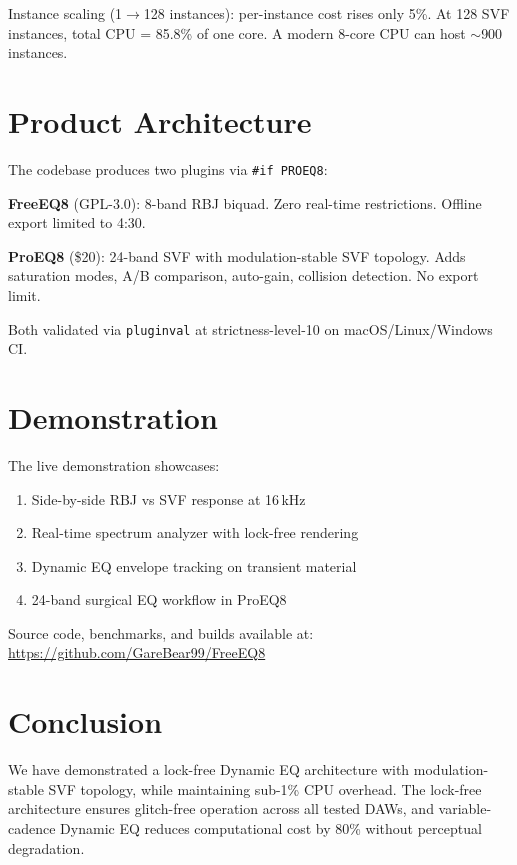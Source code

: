 \documentclass[twocolumn]{article}
\begin{document}
Instance scaling (1$\rightarrow$128 instances): per-instance cost rises only 5\%. At 128 SVF instances, total CPU = 85.8\% of one core. A modern 8-core CPU can host $\sim$900 instances.

\section{Product Architecture}

The codebase produces two plugins via \texttt{\#if PROEQ8}:

\textbf{FreeEQ8} (GPL-3.0): 8-band RBJ biquad. Zero real-time restrictions. Offline export limited to 4:30.

\textbf{ProEQ8} (\$20): 24-band SVF with modulation-stable SVF topology. Adds saturation modes, A/B comparison, auto-gain, collision detection. No export limit.

Both validated via \texttt{pluginval} at strictness-level-10 on macOS/Linux/Windows CI.

\section{Demonstration}

The live demonstration showcases:
\begin{enumerate}
\item Side-by-side RBJ vs SVF response at 16\,kHz
\item Real-time spectrum analyzer with lock-free rendering
\item Dynamic EQ envelope tracking on transient material
\item 24-band surgical EQ workflow in ProEQ8
\end{enumerate}

Source code, benchmarks, and builds available at:\\
\url{https://github.com/GareBear99/FreeEQ8}

\section{Conclusion}

We have demonstrated a lock-free Dynamic EQ architecture with modulation-stable SVF topology, while maintaining sub-1\% CPU overhead. The lock-free architecture ensures glitch-free operation across all tested DAWs, and variable-cadence Dynamic EQ reduces computational cost by 80\% without perceptual degradation.
\end{document}
